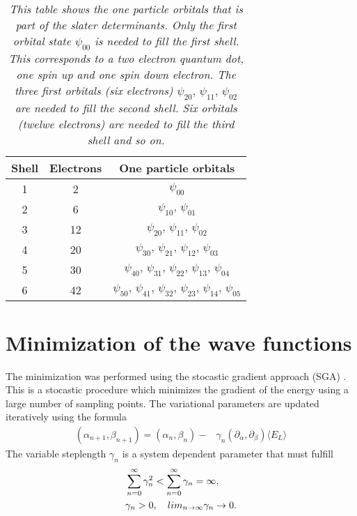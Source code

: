 \documentclass[a4paper,10pt,twocolumn]{article} %
\newcommand{\expec}[1]{\langle{}{#1}\rangle{}}
\begin{document}
\begin{table}
\begin{center}
\begin{tabular}{|c|c|c|}
\hline
Shell& Electrons & One particle orbitals \\
\hline
1&2& $\psi_{00}$ \\
2&6& $\psi_{10},\,\psi_{01}$\\
3&12& $\psi_{20},\,\psi_{11},\,\psi_{02}$\\
4&20& $\psi_{30},\,\psi_{21},\,\psi_{12},\,\psi_{03}$\\
5&30& $\psi_{40},\,\psi_{31},\,\psi_{22},\,\psi_{13},\,\psi_{04}$\\
6&42& $\psi_{50},\,\psi_{41},\,\psi_{32},\,\psi_{23},\,\psi_{14},\,\psi_{05}$\\
\hline
\end{tabular}
\caption{\it 
	This table shows the one particle orbitals that is part of the slater determinants. Only the first orbital state $\psi_{00}$ 
	is needed to fill the first shell. This corresponds to a two electron quantum dot, one spin up and one spin down electron. The
	three first orbitals (six electrons) $\psi_{20},\,\psi_{11},\,\psi_{02}$ are needed to fill the second shell. Six orbitals (twelwe electrons) are needed to fill the third shell and so on.
\label{tab:orb}
}
\label{tab0}
\end{center}
\end{table}





\section{Minimization of the wave functions}%

The minimization was performed using the stocastic gradient approach (SGA) \cite{harju_1997,harju_2005,nissenbaum_2008}. 
This is a stocastic procedure which minimizes the gradient of the energy using a large number of sampling points.
The variational parameters are updated iteratively using the formula
\begin{align}
	(\alpha_{n+1},\beta_{n+1})=	(\alpha_{n},\beta_{n}) -
	&\gamma_n\left({\partial_\alpha},{\partial_\beta}\right) \expec{E_L}\label{eq:sga1}
\end{align}
The variable steplength $\gamma_n$ is a system dependent parameter that must fulfill
\begin{align}
&	\sum_{n=0}^\infty \gamma_n^2 <
	\sum_{n=0}^\infty \gamma_n = \infty,\notag\\
    &\gamma_n>0,\quad
	lim_{n\to\infty}\gamma_n\to0.\label{eq:sga2}
\end{align}
\end{document}
